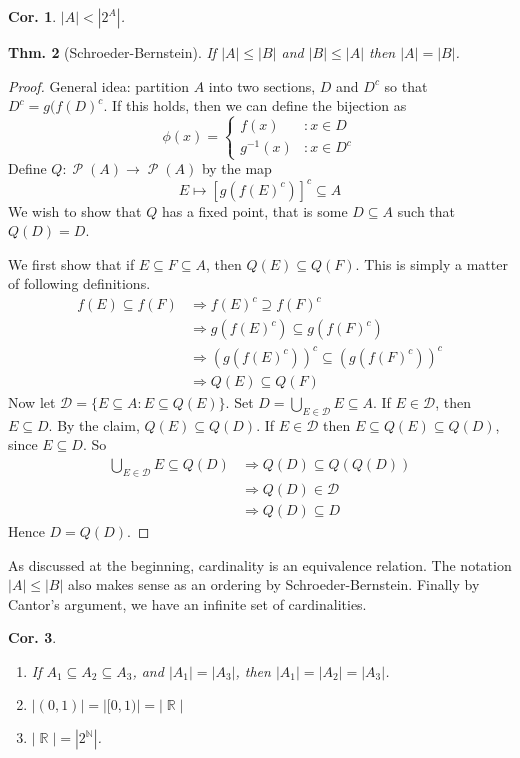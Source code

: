 \documentclass[12pt, a4paper]{book}
\DeclareMathOperator{\N}{\mathbb{N}}
\DeclareMathOperator{\R}{\mathbb{R}}
\DeclareMathOperator{\Ps}{\mathcal{P}}
\newtheorem{theorem}{Thm.}[section]
\newtheorem{corollary}[theorem]{Cor.}
\theoremstyle{nonumberplain}
\newtheorem{proof}{Proof}
\begin{document}
\begin{corollary}
    $|A|<|2^A|$.
\end{corollary}
\begin{theorem}[Schroeder-Bernstein]
    If $|A|\leq|B|$ and $|B|\leq|A|$ then $|A|=|B|$.
\end{theorem}
\begin{proof}
    General idea: partition $A$ into two sections, $D$ and $D^c$ so that $D^c=g(f(D)^c$. If this holds, then we can define
    the bijection as
    \[\phi(x)=
    \begin{cases}
        f(x)&:x\in D\\
        g^{-1}(x)&:x\in D^c
    \end{cases}
    \]
    Define $Q:\Ps(A)\to\Ps(A)$ by the map
    \[E\mapsto\left[g(f(E)^c)\right]^c\subseteq A\]
    We wish to show that $Q$ has a fixed point, that is some $D\subseteq A$ such that $Q(D)=D$.

    We first show that if $E\subseteq F\subseteq A$, then $Q(E)\subseteq Q(F)$. This is simply a matter of following
    definitions.
    \begin{align*}
        f(E)\subseteq f(F)&\Rightarrow f(E)^c\supseteq f(F)^c\\
        &\Rightarrow g(f(E)^c)\subseteq g(f(F)^c)\\
        &\Rightarrow (g(f(E)^c))^c\subseteq (g(f(F)^c))^c\\
        &\Rightarrow Q(E)\subseteq Q(F)
    \end{align*}
    Now let $\mathcal{D}=\{E\subseteq A:E\subseteq Q(E)\}$. Set $D=\bigcup_{E\in\mathcal{D}}E\subseteq A$. If
    $E\in\mathcal{D}$, then $E\subseteq D$. By the claim, $Q(E)\subseteq Q(D)$. If $E\in\mathcal{D}$ then
    $E\subseteq Q(E)\subseteq Q(D)$, since $E\subseteq D$. So
    \begin{align*}
        \bigcup_{E\in\mathcal{D}}E\subseteq Q(D) &\Rightarrow Q(D)\subseteq Q(Q(D))\\
        &\Rightarrow Q(D)\in\mathcal{D}\\
        &\Rightarrow Q(D)\subseteq D
    \end{align*}
    Hence $D=Q(D)$.

\end{proof}
As discussed at the beginning, cardinality is an equivalence relation. The notation $|A|\leq|B|$ also makes sense as an
ordering by Schroeder-Bernstein. Finally by Cantor's argument, we have an infinite set of cardinalities.
\begin{corollary}\hspace{1cm}
    \begin{enumerate}
        \item If $A_1\subseteq A_2\subseteq A_3$, and $|A_1|=|A_3|$, then $|A_1|=|A_2|=|A_3|$.
        \item $|(0,1)|=|[0,1)|=|\R|$
        \item $|\R|=|2^{\N}|$.
    \end{enumerate}
\end{corollary}
\end{document}
